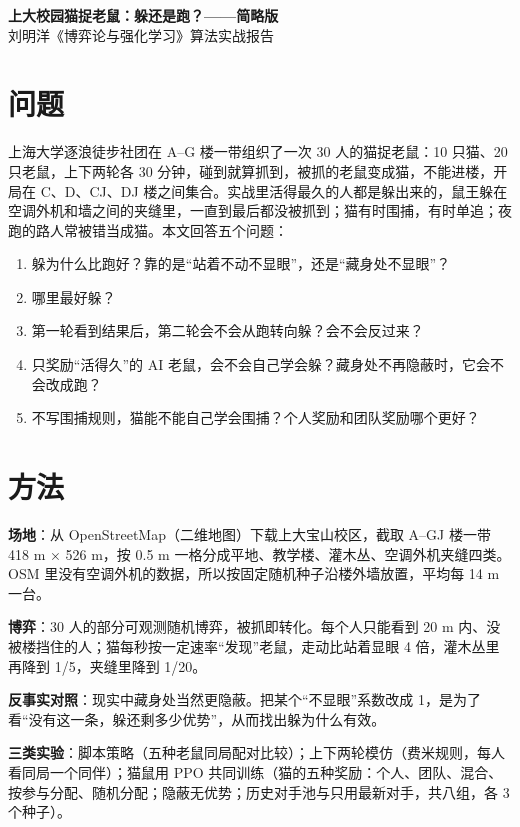 \documentclass[a4paper,zihao=5,fontset=fandol,UTF8]{ctexart}
\begin{document}
\begin{center}
{\Large\bfseries\heiti 上大校园猫捉老鼠：躲还是跑？——简略版}\\[4pt]
{\small 刘明洋\quad 《博弈论与强化学习》算法实战报告}
\end{center}

\section{问题}
上海大学逐浪徒步社团在 A–G 楼一带组织了一次 30 人的猫捉老鼠：10 只猫、20 只老鼠，上下两轮各 30 分钟，碰到就算抓到，被抓的老鼠变成猫，不能进楼，开局在 C、D、CJ、DJ 楼之间集合。实战里活得最久的人都是躲出来的，鼠王躲在空调外机和墙之间的夹缝里，一直到最后都没被抓到；猫有时围捕，有时单追；夜跑的路人常被错当成猫。本文回答五个问题：
\begin{enumerate}[label=（\arabic*）]
  \item 躲为什么比跑好？靠的是“站着不动不显眼”，还是“藏身处不显眼”？
  \item 哪里最好躲？
  \item 第一轮看到结果后，第二轮会不会从跑转向躲？会不会反过来？
  \item 只奖励“活得久”的 AI 老鼠，会不会自己学会躲？藏身处不再隐蔽时，它会不会改成跑？
  \item 不写围捕规则，猫能不能自己学会围捕？个人奖励和团队奖励哪个更好？
\end{enumerate}

\section{方法}
\textbf{场地}：从 OpenStreetMap（二维地图）下载上大宝山校区，截取 A–GJ 楼一带 418 m × 526 m，按 0.5 m 一格分成平地、教学楼、灌木丛、空调外机夹缝四类。OSM 里没有空调外机的数据，所以按固定随机种子沿楼外墙放置，平均每 14 m 一台。

\textbf{博弈}：30 人的部分可观测随机博弈，被抓即转化。每个人只能看到 20 m 内、没被楼挡住的人；猫每秒按一定速率“发现”老鼠，走动比站着显眼 4 倍，灌木丛里再降到 1/5，夹缝里降到 1/20。

\textbf{反事实对照}：现实中藏身处当然更隐蔽。把某个“不显眼”系数改成 1，是为了看“没有这一条，躲还剩多少优势”，从而找出躲为什么有效。

\textbf{三类实验}：脚本策略（五种老鼠同局配对比较）；上下两轮模仿（费米规则，每人看同局一个同伴）；猫鼠用 PPO 共同训练（猫的五种奖励：个人、团队、混合、按参与分配、随机分配；隐蔽无优势；历史对手池与只用最新对手，共八组，各 3 个种子）。
\end{document}
